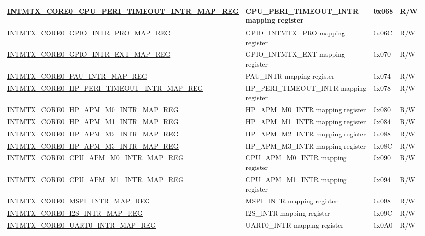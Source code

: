 \begin{longtable}{ | p{10cm} | p{10cm} | p{1.3cm} | p{1cm} | }
\hyperref[regdesc:INTMTXCORE0CPUPERITIMEOUTINTRMAPREG]{INTMTX\_CORE0\_CPU\_PERI\_TIMEOUT\_INTR\_MAP\_REG} & CPU\_PERI\_TIMEOUT\_INTR mapping register & 0x068 & R/W  \\ \hline
\hyperref[regdesc:INTMTXCORE0GPIOINTRPROMAPREG]{INTMTX\_CORE0\_GPIO\_INTR\_PRO\_MAP\_REG} & GPIO\_INTMTX\_PRO mapping register & 0x06C & R/W  \\ \hline
\hyperref[regdesc:INTMTXCORE0GPIOINTREXTMAPREG]{INTMTX\_CORE0\_GPIO\_INTR\_EXT\_MAP\_REG} & GPIO\_INTMTX\_EXT mapping register & 0x070 & R/W  \\ \hline
\hyperref[regdesc:INTMTXCORE0PAUINTRMAPREG]{INTMTX\_CORE0\_PAU\_INTR\_MAP\_REG} & PAU\_INTR mapping register & 0x074 & R/W  \\ \hline
\hyperref[regdesc:INTMTXCORE0HPPERITIMEOUTINTRMAPREG]{INTMTX\_CORE0\_HP\_PERI\_TIMEOUT\_INTR\_MAP\_REG} & HP\_PERI\_TIMEOUT\_INTR mapping register & 0x078 & R/W  \\ \hline
\hyperref[regdesc:INTMTXCORE0HPAPMM0INTRMAPREG]{INTMTX\_CORE0\_HP\_APM\_M0\_INTR\_MAP\_REG} & HP\_APM\_M0\_INTR mapping register & 0x080 & R/W  \\ \hline
\hyperref[regdesc:INTMTXCORE0HPAPMM1INTRMAPREG]{INTMTX\_CORE0\_HP\_APM\_M1\_INTR\_MAP\_REG} & HP\_APM\_M1\_INTR mapping register & 0x084 & R/W  \\ \hline
\hyperref[regdesc:INTMTXCORE0HPAPMM2INTRMAPREG]{INTMTX\_CORE0\_HP\_APM\_M2\_INTR\_MAP\_REG} & HP\_APM\_M2\_INTR mapping register & 0x088 & R/W  \\ \hline
\hyperref[regdesc:INTMTXCORE0HPAPMM3INTRMAPREG]{INTMTX\_CORE0\_HP\_APM\_M3\_INTR\_MAP\_REG} & HP\_APM\_M3\_INTR mapping register & 0x08C & R/W  \\ \hline
\hyperref[regdesc:INTMTXCORE0CPUAPMM0INTRMAPREG]{INTMTX\_CORE0\_CPU\_APM\_M0\_INTR\_MAP\_REG} & CPU\_APM\_M0\_INTR mapping register & 0x090 & R/W  \\ \hline
\hyperref[regdesc:INTMTXCORE0CPUAPMM1INTRMAPREG]{INTMTX\_CORE0\_CPU\_APM\_M1\_INTR\_MAP\_REG} & CPU\_APM\_M1\_INTR mapping register & 0x094 & R/W  \\ \hline
\hyperref[regdesc:INTMTXCORE0MSPIINTRMAPREG]{INTMTX\_CORE0\_MSPI\_INTR\_MAP\_REG} & MSPI\_INTR mapping register & 0x098 & R/W  \\ \hline
\hyperref[regdesc:INTMTXCORE0I2SINTRMAPREG]{INTMTX\_CORE0\_I2S\_INTR\_MAP\_REG} & I2S\_INTR mapping register & 0x09C & R/W  \\ \hline
\hyperref[regdesc:INTMTXCORE0UART0INTRMAPREG]{INTMTX\_CORE0\_UART0\_INTR\_MAP\_REG} & UART0\_INTR mapping register & 0x0A0 & R/W  \\ \hline

\end{longtable}
